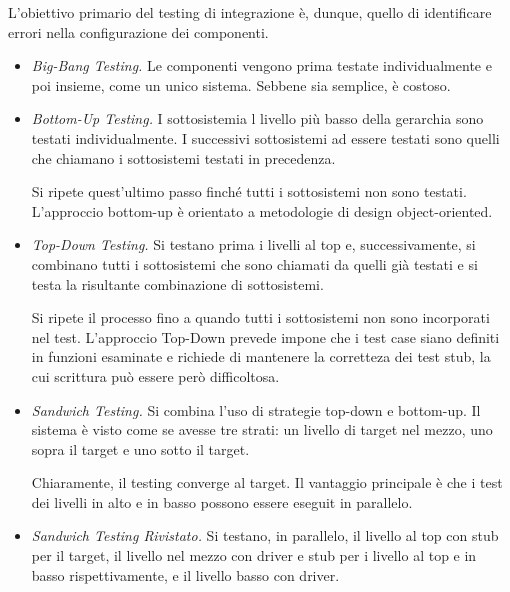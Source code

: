 \documentclass{article}
\begin{document}
        \vspace{3mm}
        
        L'obiettivo primario del testing di integrazione è, dunque, quello di identificare errori nella configurazione dei componenti.
        
        \begin{itemize}
            \item \textit{Big-Bang Testing.} Le componenti vengono prima testate individualmente e poi insieme, come un unico sistema. Sebbene sia semplice, è costoso.
            
            \item \textit{Bottom-Up Testing.} I sottosistemia l livello più basso della gerarchia sono testati individualmente. I successivi sottosistemi ad essere testati sono quelli che chiamano i sottosistemi testati in precedenza. 
            
            Si ripete quest'ultimo passo finché tutti i sottosistemi non sono testati. L'approccio bottom-up è orientato a metodologie di design object-oriented.
            
            \item \textit{Top-Down Testing.} Si testano prima i livelli al top e, successivamente, si combinano tutti i sottosistemi che sono chiamati da quelli già testati e si testa la risultante combinazione di sottosistemi. 
            
            Si ripete il processo fino a quando tutti i sottosistemi non sono incorporati nel test. L'approccio Top-Down prevede impone che i test case siano definiti in funzioni esaminate e richiede di mantenere la corretteza dei test stub, la cui scrittura può essere però difficoltosa.
            
            \item \textit{Sandwich Testing.} Si combina l'uso di strategie top-down e bottom-up. Il sistema è visto come se avesse tre strati: un livello di target nel mezzo, uno sopra il target e uno sotto il target. 
            
            Chiaramente, il testing converge al target. Il vantaggio principale è che i test dei livelli in alto e in basso possono essere eseguit in parallelo.
            
            \item \textit{Sandwich Testing Rivistato.} Si testano, in parallelo, il livello al top con stub per il target, il livello nel mezzo con driver e stub per i livello al top e in basso rispettivamente, e il livello basso con driver.
        \end{itemize}
        
\end{document}
